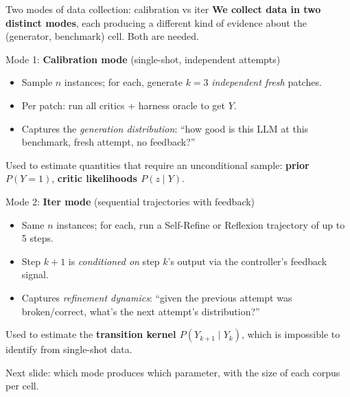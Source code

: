 \documentclass[10pt]{beamer}
\newcommand{\info}[1]{\textcolor{primaryBlue}{\textbf{#1}}}
\begin{document}
\begin{frame}{Two modes of data collection: \textcolor{accentGreen}{calibration} vs \textcolor{accentRed}{iter}}
\vspace{0.15cm}
\info{We collect data in two distinct modes}, each producing a different
kind of evidence about the (generator, benchmark) cell. Both are needed.

\vspace{0.25cm}
\begin{block}{Mode 1: \textcolor{accentGreen}{\textbf{Calibration mode}} (single-shot, independent attempts)}
\begin{itemize}
\item Sample $n$ instances; for each, generate $k=3$ \emph{independent fresh}
patches.
\item Per patch: run all critics + harness oracle to get $Y$.
\item Captures the \emph{generation distribution}: ``how good is this
LLM at this benchmark, fresh attempt, no feedback?''
\end{itemize}
\textcolor{softGrey}{Used to estimate quantities that require an
unconditional sample: \textbf{prior $P(Y{=}1)$}, \textbf{critic likelihoods $P(z\mid Y)$}.}
\end{block}

\begin{alertblock}{Mode 2: \textbf{Iter mode} (sequential trajectories with feedback)}
\begin{itemize}
\item Same $n$ instances; for each, run a Self-Refine or Reflexion trajectory
of up to 5 steps.
\item Step $k+1$ is \emph{conditioned on} step $k$'s output via the
controller's feedback signal.
\item Captures \emph{refinement dynamics}: ``given the previous attempt was
broken/correct, what's the next attempt's distribution?''
\end{itemize}
\textcolor{softGrey}{Used to estimate the \textbf{transition kernel
$P(Y_{k+1}\mid Y_k)$}, which is impossible to identify from single-shot
data.}
\end{alertblock}

\textcolor{softGrey}{\scriptsize Next slide: which mode produces which
parameter, with the size of each corpus per cell.}
\end{frame}
\end{document}
